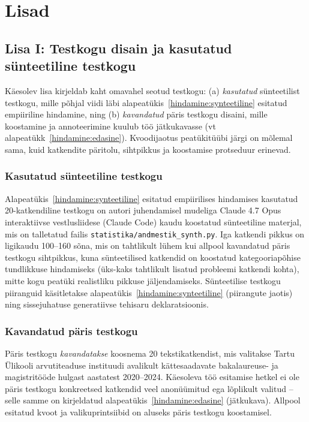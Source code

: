\section*{Lisad} \label{lisad} 

\subsection*{Lisa I: Testkogu disain ja kasutatud sünteetiline testkogu} \label{lisa:testkogu}

Käesolev lisa kirjeldab kaht omavahel seotud testkogu: (a) \emph{kasutatud} sünteetilist testkogu, mille põhjal viidi läbi alapeatükis~\ref{hindamine:synteetiline} esitatud empiiriline hindamine, ning (b) \emph{kavandatud} päris testkogu disaini, mille koostamine ja annoteerimine kuulub töö jätkukavasse (vt alapeatükk~\ref{hindamine:edasine}). Kvoodijaotus peatükitüübi järgi on mõlemal sama, kuid katkendite päritolu, sihtpikkus ja koostamise protseduur erinevad.

\subsubsection*{Kasutatud sünteetiline testkogu}

Alapeatükis~\ref{hindamine:synteetiline} esitatud empiirilises hindamises kasutatud 20-katkendiline testkogu on autori juhendamisel mudeliga Claude 4.7 Opus interaktiivse vestlusliidese (Claude Code) kaudu koostatud sünteetiline materjal, mis on talletatud failis \texttt{statistika/andmestik\_synth.py}. Iga katkendi pikkus on ligikaudu 100--160 sõna, mis on tahtlikult lühem kui allpool kavandatud päris testkogu sihtpikkus, kuna sünteetilised katkendid on koostatud kategooriapõhise tundlikkuse hindamiseks (üks-kaks tahtlikult lisatud probleemi katkendi kohta), mitte kogu peatüki realistliku pikkuse jäljendamiseks. Sünteetilise testkogu piiranguid käsitletakse alapeatükis~\ref{hindamine:synteetiline} (piirangute jaotis) ning sissejuhatuse generatiivse tehisaru deklaratsioonis.

\subsubsection*{Kavandatud päris testkogu}

Päris testkogu \emph{kavandatakse} koosnema 20 tekstikatkendist, mis valitakse Tartu Ülikooli arvutiteaduse instituudi avalikult kättesaadavate bakalaureuse- ja magistritööde hulgast aastatest 2020--2024. Käesoleva töö esitamise hetkel ei ole päris testkogu konkreetsed katkendid veel anonüümitud ega lõplikult valitud -- selle samme on kirjeldatud alapeatükis~\ref{hindamine:edasine} (jätkukava). Allpool esitatud kvoot ja valikuprintsiibid on aluseks päris testkogu koostamisel.


